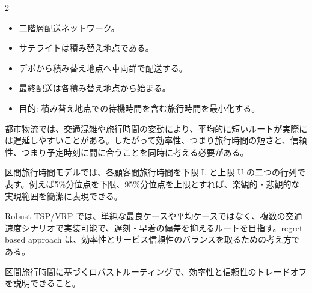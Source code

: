 \clearpage



\vspace{1.5mm}

\begin{multicols}{2}

\footnotesize

\raggedcolumns


\begin{itemize}
\item 二階層配送ネットワーク。
\item サテライトは積み替え地点である。
\item デポから積み替え地点へ車両群で配送する。
\item 最終配送は各積み替え地点から始まる。
\item 目的: 積み替え地点での待機時間を含む旅行時間を最小化する。
\end{itemize}

都市物流では、交通混雑や旅行時間の変動により、平均的に短いルートが実際には遅延しやすいことがある。したがって効率性、つまり旅行時間の短さと、信頼性、つまり予定時刻に間に合うことを同時に考える必要がある。\par

区間旅行時間モデルでは、各顧客間旅行時間を下限 L と上限 U の二つの行列で表す。例えば5\%分位点を下限、95\%分位点を上限とすれば、楽観的・悲観的な実現範囲を簡潔に表現できる。\par

Robust TSP/VRP では、単純な最良ケースや平均ケースではなく、複数の交通速度シナリオで実装可能で、遅刻・早着の偏差を抑えるルートを目指す。regret based approach は、効率性とサービス信頼性のバランスを取るための考え方である。\par

区間旅行時間に基づくロバストルーティングで、効率性と信頼性のトレードオフを説明できること。\par


\end{multicols}
